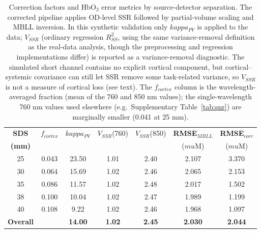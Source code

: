 \documentclass[11pt]{article}
\def\kappa{kappa}%
\def\mu{mu}%
\def\mathrm#1{#1}%
\def\,{ }%
\begin{document}
\begin{table}[ht]
\centering
\caption{Correction factors and HbO$_2$ error metrics by source-detector separation. The corrected pipeline applies OD-level SSR followed by partial-volume scaling and MBLL inversion. In this synthetic validation only $\kappa_{\mathrm{PV}}$ is applied to the data; $V_{\mathrm{SSR}}$ (ordinary regression $R^2_{\mathrm{SS}}$, using the same variance-removal definition as the real-data analysis, though the preprocessing and regression implementations differ) is reported as a variance-removal diagnostic. The simulated short channel contains no explicit cortical component, but cortical--systemic covariance can still let SSR remove some task-related variance, so $V_{\mathrm{SSR}}$ is not a measure of cortical loss (see text). The $f_{\mathrm{cortex}}$ column is the wavelength-averaged fraction (mean of the 760 and 850\,nm values); the single-wavelength 760\,nm values used elsewhere (e.g.\ Supplementary Table~\ref{tab:snr}) are marginally smaller (0.041 at 25\,mm).}
\label{tab:results}
\begin{tabular}{@{}ccccccc@{}}
\toprule
\textbf{SDS} & $f_{\mathrm{cortex}}$ & $\kappa_{\mathrm{PV}}$ & $V_{\mathrm{SSR}}$(760) & $V_{\mathrm{SSR}}$(850) & \textbf{RMSE}$_{\mathrm{MBLL}}$ & \textbf{RMSE}$_{\mathrm{corr}}$ \\
\textbf{(mm)} & & & & & ($\mu$M) & ($\mu$M) \\
\midrule
25 & 0.043 & 23.50 & 1.01 & 2.40 & 2.107 & 3.370 \\
30 & 0.064 & 15.69 & 1.02 & 2.46 & 2.065 & 2.153 \\
35 & 0.086 & 11.57 & 1.02 & 2.48 & 2.017 & 1.502 \\
38 & 0.100 & 10.04 & 1.02 & 2.47 & 1.989 & 1.199 \\
40 & 0.108 & 9.22 & 1.02 & 2.46 & 1.968 & 1.097 \\
\midrule
\textbf{Overall} & & \textbf{14.00} & \textbf{1.02} & \textbf{2.45} & \textbf{2.030} & \textbf{2.044} \\
\bottomrule
\end{tabular}
\end{table}
\end{document}
